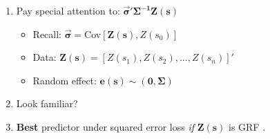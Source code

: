 \documentclass{article}
\begin{document}
\begin{enumerate}
\item Pay special attention to: $\mathbf{ \vec{\sigma}'\Sigma^{-1}Z(s)}$
  \begin{itemize}
  \item Recall: $\mathbf{\vec{\sigma} =}$Cov$[\mathbf{Z(s)},Z(s_{0})]$
  \item Data: $\mathbf{Z(s)} = [Z(s_{1}), Z(s_{2}),\hdots, Z(s_{n})]'$
  \item Random effect: $\mathbf{e(s) \sim (0, \Sigma)}$
  \end{itemize}

\item Look familiar?

\item {\bf Best} predictor under squared error loss {\it if } $\mathbf{Z(s)}$ is GRF .
\end{enumerate}


\end{document}
